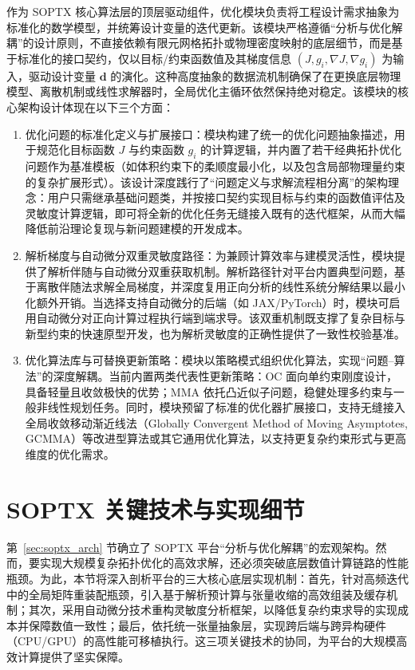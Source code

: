 作为 SOPTX 核心算法层的顶层驱动组件，优化模块负责将工程设计需求抽象为标准化的数学模型，并统筹设计变量的迭代更新。该模块严格遵循“分析与优化解耦”的设计原则，不直接依赖有限元网格拓扑或物理密度映射的底层细节，而是基于标准化的接口契约，仅以目标/约束函数值及其梯度信息 $(J, g_i, \nabla J, \nabla g_i)$ 为输入，驱动设计变量 $\boldsymbol{d}$ 的演化。这种高度抽象的数据流机制确保了在更换底层物理模型、离散机制或线性求解器时，全局优化主循环依然保持绝对稳定。该模块的核心架构设计体现在以下三个方面：
\begin{enumerate}[
	label={（\arabic*）},
	labelsep=0.25em,
	leftmargin=3.2em,
	itemsep=0.4em,
	topsep=0.4em,
	parsep=0pt,
	partopsep=0pt
	] 
	\item 优化问题的标准化定义与扩展接口：模块构建了统一的优化问题抽象描述，用于规范化目标函数 $J$ 与约束函数 $g_i$ 的计算逻辑，并内置了若干经典拓扑优化问题作为基准模板（如体积约束下的柔顺度最小化，以及包含局部物理量约束的复杂扩展形式）。该设计深度践行了“问题定义与求解流程相分离”的架构理念：用户只需继承基础问题类，并按接口契约实现目标与约束的函数值评估及灵敏度计算逻辑，即可将全新的优化任务无缝接入既有的迭代框架，从而大幅降低前沿理论复现与新问题建模的开发成本。
	
	\item 解析梯度与自动微分双重灵敏度路径：为兼顾计算效率与建模灵活性，模块提供了解析伴随与自动微分双重获取机制。解析路径针对平台内置典型问题，基于离散伴随法求解全局梯度，并深度复用正向分析的线性系统分解结果以最小化额外开销。当选择支持自动微分的后端（如 JAX/PyTorch）时，模块可启用自动微分对正向计算过程执行端到端求导。该双重机制既支撑了复杂目标与新型约束的快速原型开发，也为解析灵敏度的正确性提供了一致性校验基准。
	
	\item 优化算法库与可替换更新策略：模块以策略模式组织优化算法，实现“问题--算法”的深度解耦。当前内置两类代表性更新策略：OC 面向单约束刚度设计，具备轻量且收敛极快的优势；MMA 依托凸近似子问题，稳健处理多约束与一般非线性规划任务。同时，模块预留了标准的优化器扩展接口，支持无缝接入全局收敛移动渐近线法（Globally Convergent Method of Moving Asymptotes, GCMMA）等改进型算法或其它通用优化算法，以支持更复杂约束形式与更高维度的优化需求。
\end{enumerate}


\section{SOPTX 关键技术与实现细节}
\label{sec:soptx_tech}

第~\ref{sec:soptx_arch} 节确立了 SOPTX 平台“分析与优化解耦”的宏观架构。然而，要实现大规模复杂拓扑优化的高效求解，还必须突破底层数值计算链路的性能瓶颈。为此，本节将深入剖析平台的三大核心底层实现机制：首先，针对高频迭代中的全局矩阵重装配瓶颈，引入基于解析预计算与张量收缩的高效组装及缓存机制；其次，采用自动微分技术重构灵敏度分析框架，以降低复杂约束求导的实现成本并保障数值一致性；最后，依托统一张量抽象层，实现跨后端与跨异构硬件（CPU/GPU）的高性能可移植执行。这三项关键技术的协同，为平台的大规模高效计算提供了坚实保障。



